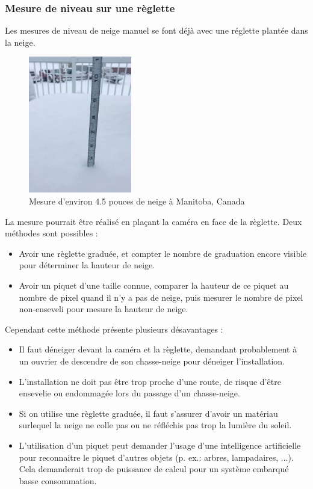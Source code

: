 \subsubsection{Mesure de niveau sur une règlette}
Les mesures de niveau de neige manuel se font déjà avec une réglette plantée dans la neige.

\begin{figure}[H]
    \centering
    \includegraphics[width=0.4\textwidth]{Images/computer_vision/snow_meter.PNG}
    \caption[]{Mesure d'environ 4.5 pouces de neige à Manitoba, Canada\footnotemark[1]}
    \label{Snow meter}
\end{figure}

La mesure pourrait être réalisé en plaçant la caméra en face de la règlette.
Deux méthodes sont possibles :
\begin{itemize}
    \item Avoir une règlette graduée, et compter le nombre de graduation encore visible
    pour déterminer la hauteur de neige.
    \item Avoir un piquet d'une taille connue, comparer la hauteur de ce piquet au nombre
    de pixel quand il n'y a pas de neige, puis mesurer le nombre de pixel non-enseveli pour
    mesure la hauteur de neige.
\end{itemize}

Cependant cette méthode présente plusieurs désavantages :
\begin{itemize}
    \item Il faut déneiger devant la caméra et la règlette, demandant probablement à un ouvrier
    de descendre de son chasse-neige pour déneiger l'installation.
    \item L'installation ne doit pas être trop proche d'une route, de risque d'être ensevelie
    ou endommagée lors du passage d'un chasse-neige.
    \item Si on utilise une règlette graduée, il faut s'assurer d'avoir un matériau
    surlequel la neige ne colle pas ou ne réfléchis pas trop la lumière du soleil.
    \item L'utilisation d'un piquet peut demander l'usage d'une intelligence artificielle
    \footnotemark[2] pour reconnaitre le piquet d'autres objets (p. ex.: arbres, lampadaires, ...).
    Cela demanderait trop de puissance de calcul pour un système embarqué basse consommation.
\end{itemize}
\newpage

